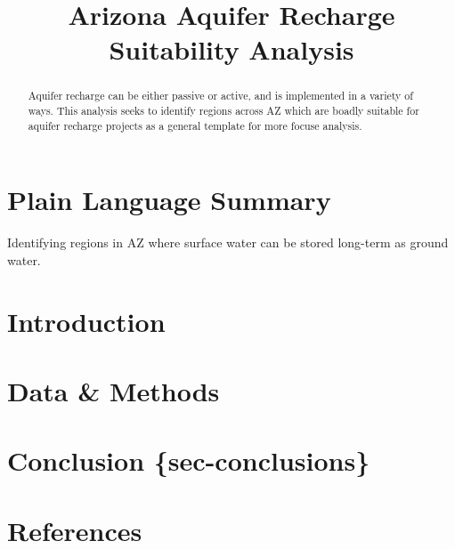 \documentclass[
]{agujournal2019}
\begin{document}
\title{Arizona Aquifer Recharge Suitability Analysis}



\begin{abstract}
Aquifer recharge can be either passive or active, and is implemented in
a variety of ways. This analysis seeks to identify regions across AZ
which are boadly suitable for aquifer recharge projects as a general
template for more focuse analysis.
\end{abstract}

\section*{Plain Language Summary}
Identifying regions in AZ where surface water can be stored long-term as
ground water.




\section{Introduction}\label{introduction}

\section{Data \& Methods}\label{sec-data-methods}

\section{Conclusion
\{sec-conclusions\}}\label{conclusion-sec-conclusions}

\section*{References}\label{references}
\end{document}
